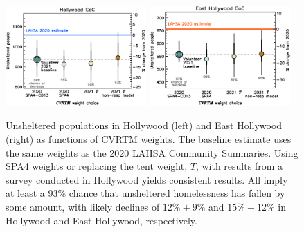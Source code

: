 \documentclass[11pt,twocolumn]{article}
\def\resp{respectively}
\begin{document}
\begin{figure}[h!]
	\centering
	\includegraphics[width = 0.48\textwidth, trim = 0cm 0.5cm 0cm 0cm]{hwoodFinal}
	\includegraphics[width = 0.48\textwidth, trim = 0cm 0.5cm 0cm 0cm]{ehoFinal}	
	\caption{Unsheltered populations in Hollywood (left) and East Hollywood (right) 
			as functions of CVRTM weights. The baseline estimate uses the same weights as the 
			2020 LAHSA Community Summaries. Using SPA4 weights or replacing the tent 
			weight, $T$, with results from a survey conducted in Hollywood yields consistent
			results. All imply at least a 93\% chance that unsheltered homelessness has fallen
			by some amount, with likely declines of $12\%\pm9\%$ and $15\%\pm12\%$
			in Hollywood and East Hollywood, \resp.}
	\label{fig:wtComp}
\end{figure}
\end{document}
